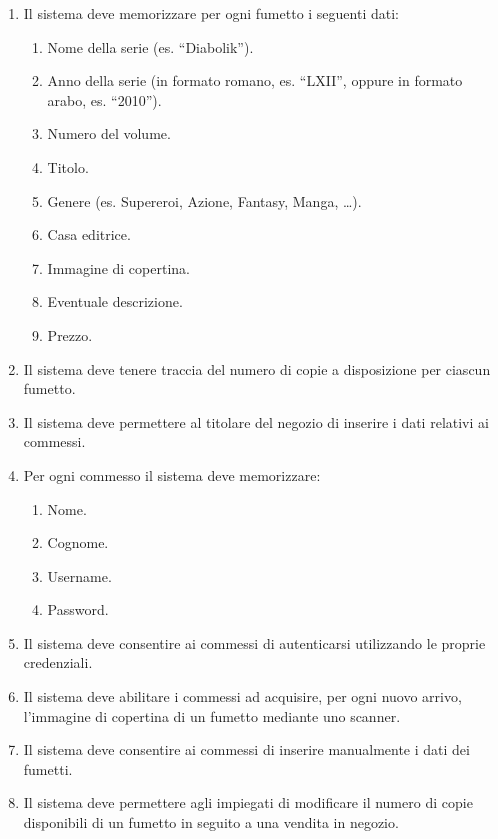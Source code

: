 \documentclass[12pt, a4paper]{article}
\begin{document}
\begin{enumerate}

\item Il sistema deve memorizzare per ogni fumetto i seguenti dati:
  \begin{enumerate}
    \item Nome della serie (es. “Diabolik”).
    \item Anno della serie (in formato romano, es. “LXII”, oppure in formato arabo, es. “2010”).
    \item Numero del volume.
    \item Titolo.
    \item Genere (es. Supereroi, Azione, Fantasy, Manga, …).
    \item Casa editrice.
    \item Immagine di copertina.
    \item Eventuale descrizione.
    \item Prezzo.
  \end{enumerate}

\item Il sistema deve tenere traccia del numero di copie a disposizione per ciascun fumetto.

\item Il sistema deve permettere al titolare del negozio di inserire i dati relativi ai commessi.

\item Per ogni commesso il sistema deve memorizzare:
  \begin{enumerate}
    \item Nome.
    \item Cognome.
    \item Username.
    \item Password.
  \end{enumerate}

\item Il sistema deve consentire ai commessi di autenticarsi utilizzando le proprie credenziali.

\item Il sistema deve abilitare i commessi ad acquisire, per ogni nuovo arrivo, l’immagine di copertina di un fumetto mediante uno scanner.

\item Il sistema deve consentire ai commessi di inserire manualmente i dati dei fumetti.

\item Il sistema deve permettere agli impiegati di modificare il numero di copie disponibili di un fumetto in seguito a una vendita in negozio.


\end{enumerate}
\end{document}
